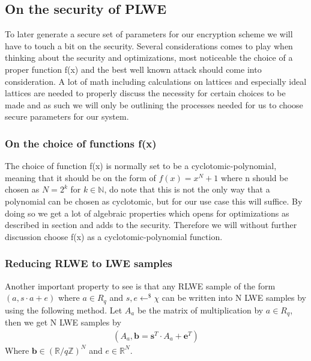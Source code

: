 \documentclass[../main.tex]{subfiles}
\begin{document}
\subsection{On the security of PLWE}
    To later generate a secure set of parameters for our encryption scheme we will have to touch a bit on the security.
    Several considerations comes to play when thinking about the security and optimizations, most noticeable the choice
    of a proper function f(x) and the best well known attack should come into consideration.
    A lot of math including calculations on lattices and especially ideal lattices are needed to properly discuss the
    necessity for certain choices to be made and as such we will only be outlining the processes needed for us to choose
    secure parameters for our system.

    \subsubsection{On the choice of functions f(x)}
        The choice of function f(x) is normally set to be a cyclotomic-polynomial, meaning that it should be on the form
        of $f(x) = x^N + 1$ where n should be chosen as $N = 2^k$ for $k \in \mathbb{N}$, do note that this is not the only
        way that a polynomial can be chosen as cyclotomic, but for our use case this will suffice.
        By doing so we get a lot of algebraic properties which opens for optimizations as described in section %
        and adds to the security.
        Therefore we will without further discussion choose f(x) as a cyclotomic-polynomial function.

    \subsubsection{Reducing RLWE to LWE samples}
        Another important property to see is that any RLWE sample of the form $(a, s \cdot a + e)$ 
		where $a \in R_q$ and $s, e \leftarrow^\$ \chi$ can be written into N LWE samples by using the following method.
        Let $A_a$ be the matrix of multiplication by $a \in R_q$, then we get N LWE samples by
        \begin{align*}
            (A_a, \textbf{b} = \textbf{s}^T \cdot A_a + \textbf{e}^T)
        \end{align*}
        Where $\textbf{b} \in (\mathbb{R} / q\mathbb{Z})^N$ and $e \in \mathbb{R}^N$.
\end{document}
